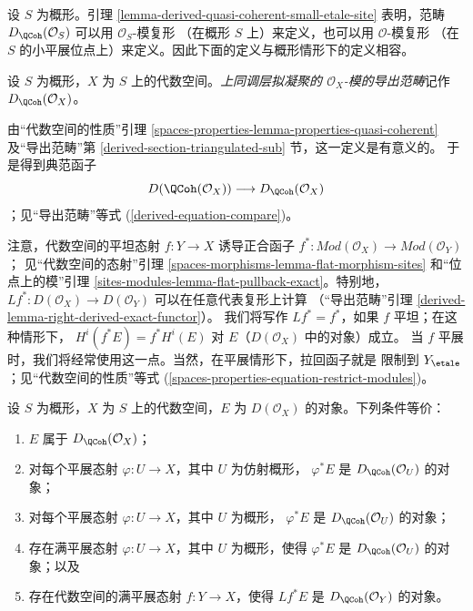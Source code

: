 \noindent
设 $S$ 为概形。引理
\ref{lemma-derived-quasi-coherent-small-etale-site}
表明，范畴 $D_\QCoh(\mathcal{O}_S)$ 可以用 $\mathcal{O}_S$-模复形
（在概形 $S$ 上）来定义，也可以用 $\mathcal{O}$-模复形
（在 $S$ 的小平展位点上）来定义。因此下面的定义与概形情形下的定义相容。

\begin{definition}
\label{definition-derived-quasi-coherent}
设 $S$ 为概形，$X$ 为 $S$ 上的代数空间。{\it 上同调层拟凝聚的
$\mathcal{O}_X$-模的导出范畴}记作 $D_\QCoh(\mathcal{O}_X)$。
\end{definition}

\noindent
由“代数空间的性质”引理
\ref{spaces-properties-lemma-properties-quasi-coherent}
及“导出范畴”第 \ref{derived-section-triangulated-sub} 节，这一定义是有意义的。
于是得到典范函子
\begin{equation}
\label{equation-compare}
D(\QCoh(\mathcal{O}_X))
\longrightarrow
D_\QCoh(\mathcal{O}_X)
\end{equation}
；见“导出范畴”等式 (\ref{derived-equation-compare})。

\medskip\noindent
注意，代数空间的平坦态射 $f : Y \to X$ 诱导正合函子
$f^* : \textit{Mod}(\mathcal{O}_X) \to \textit{Mod}(\mathcal{O}_Y)$；
见“代数空间的态射”引理
\ref{spaces-morphisms-lemma-flat-morphism-sites} 和“位点上的模”引理
\ref{sites-modules-lemma-flat-pullback-exact}。特别地，
$Lf^* : D(\mathcal{O}_X) \to D(\mathcal{O}_Y)$ 可以在任意代表复形上计算
（“导出范畴”引理 \ref{derived-lemma-right-derived-exact-functor}）。
我们将写作 $Lf^* = f^*$，如果 $f$ 平坦；在这种情形下，
$H^i(f^*E) = f^*H^i(E)$ 对 $E$（$D(\mathcal{O}_X)$ 中的对象）成立。
当 $f$ 平展时，我们将经常使用这一点。当然，在平展情形下，拉回函子就是
限制到 $Y_\etale$；见“代数空间的性质”等式
(\ref{spaces-properties-equation-restrict-modules})。

\begin{lemma}
\label{lemma-check-quasi-coherence-on-covering}
设 $S$ 为概形，$X$ 为 $S$ 上的代数空间，$E$ 为
$D(\mathcal{O}_X)$ 的对象。下列条件等价：
\begin{enumerate}
\item $E$ 属于 $D_\QCoh(\mathcal{O}_X)$；
\item 对每个平展态射 $\varphi : U \to X$，其中 $U$ 为仿射概形，
$\varphi^*E$ 是 $D_\QCoh(\mathcal{O}_U)$ 的对象；
\item 对每个平展态射 $\varphi : U \to X$，其中 $U$ 为概形，
$\varphi^*E$ 是 $D_\QCoh(\mathcal{O}_U)$ 的对象；
\item 存在满平展态射 $\varphi : U \to X$，其中 $U$ 为概形，使得
$\varphi^*E$ 是 $D_\QCoh(\mathcal{O}_U)$ 的对象；以及
\item 存在代数空间的满平展态射 $f : Y \to X$，使得
$Lf^*E$ 是 $D_\QCoh(\mathcal{O}_Y)$ 的对象。
\end{enumerate}
\end{lemma}


